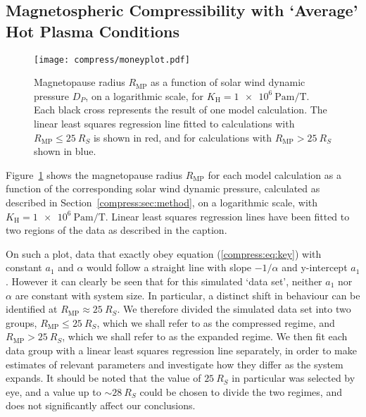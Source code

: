 \subsection{Magnetospheric Compressibility with `Average' Hot Plasma Conditions}
\begin{figure}
\centering
\noindent\texttt{[image: compress/moneyplot.pdf]}
\caption[Magnetopause radius versus solar wind dynamic pressure compressibility profile for `typical' hot plasma content $K_\mathrm{H}$.]{Magnetopause radius $R_\mathrm{MP}$ as a function of solar wind dynamic pressure $D_{P}$, on a logarithmic scale, for $K_\mathrm{H}=\SI{1e6}{\pascal\meter\per\tesla}$. Each black cross represents the result of one model calculation. The linear least squares regression line fitted to calculations with $R_\mathrm{MP} \leq \SI{25}{R_S}$ is shown in red, and for calculations with $R_\mathrm{MP} > \SI{25}{R_S}$ shown in blue.}
\label{compress:fig:money1}
\end{figure}
Figure~\ref{compress:fig:money1} shows the magnetopause radius $R_\mathrm{MP}$ for each model calculation as a function of the corresponding solar wind dynamic pressure, calculated as described in Section~\ref{compress:sec:method}, on a logarithmic scale, with $K_\mathrm{H}=\SI{1e6}{\pascal\meter\per\tesla}$. Linear least squares regression lines have been fitted to two regions of the data as described in the caption.

On such a plot, data that exactly obey equation (\ref{compress:eq:key}) with constant $a_1$ and $\alpha$ would follow a straight line with slope $-1/\alpha$ and y-intercept $a_1$. However it can clearly be seen that for this simulated `data set', neither $a_1$ nor $\alpha$ are constant with system size.
In particular, a distinct shift in behaviour can be identified at $R_\mathrm{MP} \approx \SI{25}{R_S}$. We therefore divided the simulated data set into two groups, $R_\mathrm{MP} \leq \SI{25}{R_S}$, which we shall refer to as the compressed regime, and $R_\mathrm{MP} > \SI{25}{R_S}$, which we shall refer to as the expanded regime. We then fit each data group with a linear least squares regression line separately, in order to make estimates of relevant parameters and investigate how they differ as the system expands. It should be noted that the value of $\SI{25}{R_S}$ in particular was selected by eye, and a value up to ${\sim}\SI{28}{R_S}$ could be chosen to divide the two regimes, and does not significantly affect our conclusions.

